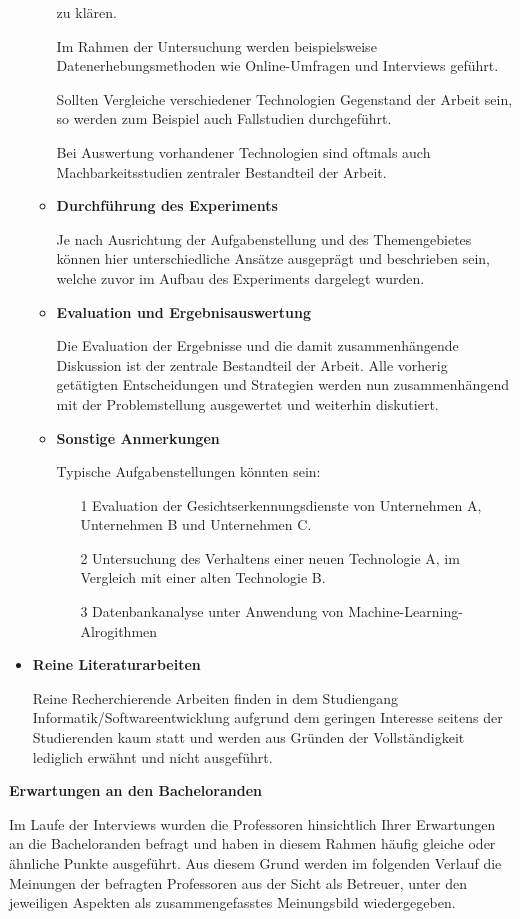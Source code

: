 \documentclass{scrreprt}
\begin{document}
\begin{itemize}
\begin{itemize}
	zu klären. 
	\par Im Rahmen der Untersuchung werden beispielsweise Datenerhebungsmethoden wie 
	Online-Umfragen und Interviews geführt. 
	\par Sollten Vergleiche verschiedener Technologien 
	Gegenstand der Arbeit sein, so werden zum Beispiel auch Fallstudien durchgeführt. 
	\par Bei Auswertung vorhandener Technologien sind oftmals auch Machbarkeitsstudien zentraler 
	Bestandteil der Arbeit.
	\item \textbf{Durchführung des Experiments}
	\par Je nach Ausrichtung der Aufgabenstellung und des Themengebietes können hier 
	unterschiedliche Ansätze ausgeprägt und beschrieben sein, welche zuvor im Aufbau des 
	Experiments dargelegt wurden. 
	\item \textbf{Evaluation und Ergebnisauswertung}
	\par Die Evaluation der Ergebnisse und die damit zusammenhängende Diskussion ist der 
	zentrale Bestandteil der Arbeit. Alle vorherig getätigten Entscheidungen und Strategien 
	werden nun zusammenhängend mit der Problemstellung ausgewertet und weiterhin diskutiert. 
	\item \textbf{Sonstige Anmerkungen}
	\par Typische Aufgabenstellungen könnten sein:
	\begin{itemize}
		\item[1] Evaluation der Gesichtserkennungsdienste von Unternehmen A, Unternehmen B und 
		Unternehmen C.
		\item[2] Untersuchung des Verhaltens einer neuen Technologie A, im Vergleich mit einer 
		alten Technologie B.
		\item[3] Datenbankanalyse unter Anwendung von Machine-Learning-Alrogithmen
	\end{itemize}
	\end{itemize}
\item \textbf{Reine Literaturarbeiten}
\par Reine Recherchierende Arbeiten finden in dem Studiengang Informatik/Softwareentwicklung aufgrund dem geringen Interesse seitens der Studierenden kaum statt und werden aus Gründen der Vollständigkeit lediglich erwähnt und nicht ausgeführt.
\end{itemize}

\textbf{Erwartungen an den Bacheloranden}\\
\par Im Laufe der Interviews wurden die Professoren hinsichtlich Ihrer Erwartungen an die Bacheloranden befragt und haben in diesem Rahmen häufig gleiche oder ähnliche Punkte ausgeführt. Aus diesem Grund werden im folgenden Verlauf die Meinungen der befragten Professoren aus der Sicht als Betreuer, unter den jeweiligen Aspekten als zusammengefasstes Meinungsbild wiedergegeben.\\
\end{document}
